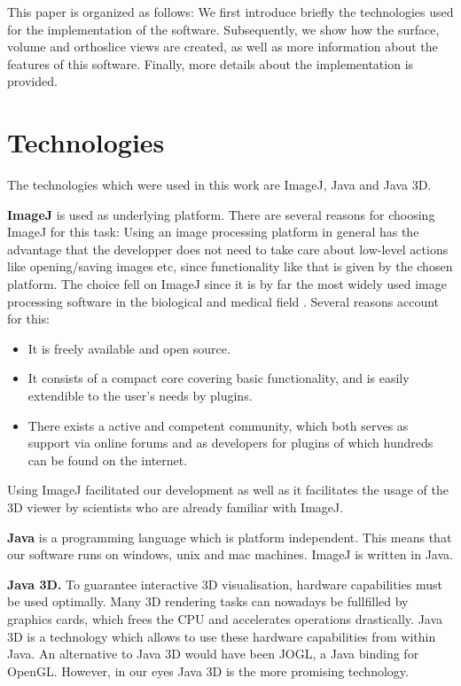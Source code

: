 \documentclass[a4paper,10pt]{article}
\begin{document}
This paper is organized as follows: We first introduce briefly the technologies used for the implementation of the software. Subsequently, we show how the surface, volume and orthoslice views are created, as well as more information about the features of this software. Finally, more details about the implementation is provided.


\section{Technologies}
The technologies which were used in this work are ImageJ, Java and Java 3D.

\textbf{ImageJ} \cite{imagej} is used as underlying platform. There are several reasons for choosing ImageJ for this task: Using an image processing platform in general has the advantage that the developper does not need to take care about low-level actions like opening/saving images etc, since functionality like that is given by the chosen platform. The choice fell on ImageJ since it is by far the most widely used image processing software in the biological and medical field \cite{mbf}. Several reasons account for this:
\begin{itemize}
\item It is freely available and open source.
\item It consists of a compact core covering basic functionality, and is easily extendible to the user's needs by plugins.
\item There exists a active and competent community, which both serves as support via online forums and as developers for plugins of which hundreds can be found on the internet.
\end{itemize}
Using ImageJ facilitated our development as well as it facilitates the usage of the 3D viewer by scientists who are already familiar with ImageJ.

\textbf{Java} \cite{java} is a programming language which is platform independent. This means that our software runs on windows, unix and mac machines. ImageJ is written in Java.

\textbf{Java 3D.} To guarantee interactive 3D visualisation, hardware capabilities must be used optimally. Many 3D rendering tasks can nowadays be fullfilled by graphics cards, which frees the CPU and accelerates operations drastically. Java 3D \cite{java3d} is a technology which allows to use these hardware capabilities from within Java. An alternative to Java 3D would have been JOGL, a Java binding for OpenGL. However, in our eyes Java 3D is the more promising technology.
\end{document}
